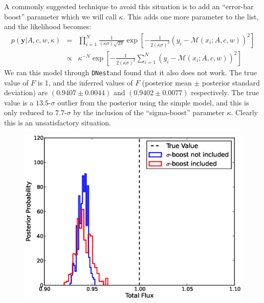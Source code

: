 \documentclass[letterpaper, 11pt]{article}
\newcommand{\yy}{\mathbf{y}}
\newcommand{\dnest}{\texttt{DNest}}
\begin{document}
A commonly suggested technique \citep[e.g.][]{gregory} to avoid this situation
is to add an ``error-bar boost'' parameter which we will call $\kappa$.
This adds one more parameter to the list, and the likelihood becomes:
\begin{eqnarray}
p(\yy|A, c, w, \kappa) &=& \prod_{i=1}^N
\frac{1}{(\kappa\sigma)\sqrt{2\pi}}
\exp
\left[
-\frac{1}{2(\kappa\sigma)^2}\left(y_i - \mathcal{M}(x_i; A, c, w)\right)^2
\right] \\
&\propto& \kappa^{-N}\exp\left[-\frac{1}{2(\kappa\sigma)^2}\sum_{i=1}^N\left(y_i - \mathcal{M}(x_i; A, c, w)\right)^2\right]
\end{eqnarray}
We ran this model through \dnest and found that it also does not work. The
true value of $F$ is 1, and the inferred values of $F$ (posterior mean
$\pm$ posterior standard deviation) are
$(0.9407 \pm 0.0044)$ and $(0.9402 \pm 0.0077)$
respectively. The true value is a $13.5$-$\sigma$ outlier from the posterior
using the simple model, and this is only reduced to $7.7$-$\sigma$ by the
inclusion of the ``sigma-boost'' parameter $\kappa$. Clearly this is an
unsatisfactory situation.

\begin{figure}
\begin{center}
\includegraphics[scale=0.5]{failure.eps}
\caption{\label{failure}}
\end{center}
\end{figure}
\end{document}
